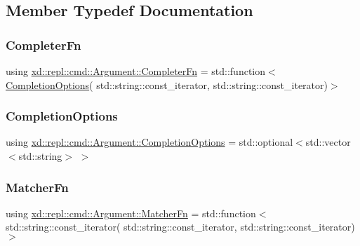 \subsection{Member Typedef Documentation}
\mbox{\label{classxd_1_1repl_1_1cmd_1_1_argument_ae3fcd7357ab584e17d2fb86c1f077fe9}} 
\subsubsection{\texorpdfstring{Completer\+Fn}{CompleterFn}}
{\footnotesize\ttfamily using \mbox{\hyperlink{classxd_1_1repl_1_1cmd_1_1_argument_ae3fcd7357ab584e17d2fb86c1f077fe9}{xd\+::repl\+::cmd\+::\+Argument\+::\+Completer\+Fn}} =  std\+::function$<$\mbox{\hyperlink{classxd_1_1repl_1_1cmd_1_1_argument_a633ddaf50445b1f77d11d7e3bf0c4ea8}{Completion\+Options}}( std\+::string\+::const\+\_\+iterator, std\+::string\+::const\+\_\+iterator)$>$}

\mbox{\label{classxd_1_1repl_1_1cmd_1_1_argument_a633ddaf50445b1f77d11d7e3bf0c4ea8}} 
\subsubsection{\texorpdfstring{Completion\+Options}{CompletionOptions}}
{\footnotesize\ttfamily using \mbox{\hyperlink{classxd_1_1repl_1_1cmd_1_1_argument_a633ddaf50445b1f77d11d7e3bf0c4ea8}{xd\+::repl\+::cmd\+::\+Argument\+::\+Completion\+Options}} =  std\+::optional$<$std\+::vector$<$std\+::string$>$ $>$}

\mbox{\label{classxd_1_1repl_1_1cmd_1_1_argument_a7284341abe139b035abfc7e1dca5d42e}} 
\subsubsection{\texorpdfstring{Matcher\+Fn}{MatcherFn}}
{\footnotesize\ttfamily using \mbox{\hyperlink{classxd_1_1repl_1_1cmd_1_1_argument_a7284341abe139b035abfc7e1dca5d42e}{xd\+::repl\+::cmd\+::\+Argument\+::\+Matcher\+Fn}} =  std\+::function$<$std\+::string\+::const\+\_\+iterator( std\+::string\+::const\+\_\+iterator, std\+::string\+::const\+\_\+iterator)$>$}



